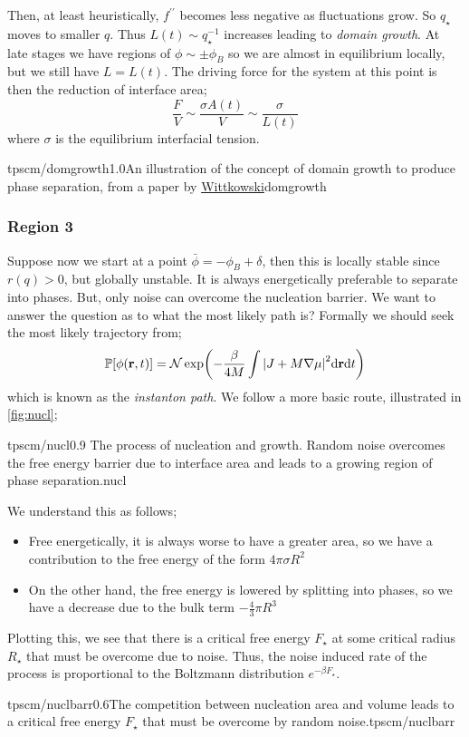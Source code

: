 Then, at least heuristically, $f^{\prime\prime}$ becomes less negative as fluctuations grow. So $q_{\star}$ moves to smaller $q$. Thus $L(t) \sim q_{\star}^{-1}$ increases leading to \emph{domain growth}. At late stages we have regions of $\phi \sim \pm \phi_B$ so we are almost in equilibrium locally, but we still have $L = L(t)$. The driving force for the system at this point is then the reduction of interface area;
\begin{equation*}
\frac{F}{V} \sim \frac{\sigma A(t)}{V} \sim \frac{\sigma}{L(t)}
\end{equation*}
where $\sigma$ is the equilibrium interfacial tension.
\begin{mygraphic}{tpscm/domgrowth}{1.0}{An illustration of the concept of domain growth to produce phase separation, from a paper by \href{https://lucris.lub.lu.se/ws/files/4018932/4580825.pdf}{Wittkowski}}{domgrowth}\end{mygraphic}
\subsubsection*{Region 3}
Suppose now we start at a point $\bar{\phi} = -\phi_B + \delta$, then this is locally stable since $r(q) > 0$, but globally unstable. It is always energetically preferable to separate into phases. But, only noise can overcome the nucleation barrier. We want to answer the question as to what the most likely path is? Formally we should seek the most likely trajectory from;
\begin{equation*}
\mathbb{P}[\phi(\vec{r}, t)] = \mathcal{N}\exp\left(-\frac{\beta}{4M}\int{\abs{J + M\nabla \mu}}^2 \ud\vec{r}\ud t\right)
\end{equation*}
which is known as the \emph{instanton path}. We follow a more basic route, illustrated in \autoref{fig:nucl};
\begin{mygraphic}{tpscm/nucl}{0.9}{ The process of nucleation and growth. Random noise overcomes the free energy barrier due to interface area and leads to a growing region of phase separation.}{nucl}\end{mygraphic}
We understand this as follows;
\begin{itemize}
\item Free energetically, it is always worse to have a greater area, so we have a contribution to the free energy of the form $4\pi \sigma R^2$
\item On the other hand, the free energy is lowered by splitting into phases, so we have a decrease due to the bulk term $-\tfrac{4}{3}\pi R^3$
\end{itemize}
Plotting this, we see that there is a critical free energy $F_{\star}$ at some critical radius $R_{\star}$ that must be overcome due to noise. Thus, the noise induced rate of the process is proportional to the Boltzmann distribution $e^{-\beta F_{\star}}$. 
\begin{mygraphic}{tpscm/nuclbarr}{0.6}{The competition between nucleation area and volume leads to a critical free energy $F_{\star}$ that must be overcome by random noise.}{tpscm/nuclbarr}\end{mygraphic}
